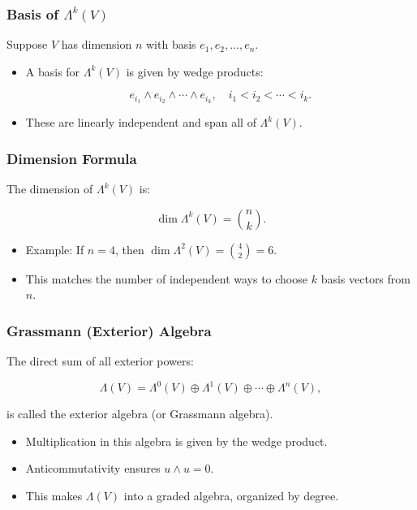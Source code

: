 \documentclass[
  letterpaper,
  DIV=11,
  numbers=noendperiod]{scrreprt}
\providecommand{\tightlist}{%
  \setlength{\itemsep}{0pt}\setlength{\parskip}{0pt}}
\begin{document}
\subsubsection{\texorpdfstring{Basis of
\(\Lambda^k(V)\)}{Basis of \textbackslash Lambda\^{}k(V)}}\label{basis-of-lambdakv}

Suppose \(V\) has dimension \(n\) with basis \(e_1, e_2, \dots, e_n\).

\begin{itemize}
\item
  A basis for \(\Lambda^k(V)\) is given by wedge products:

  \[
  e_{i_1} \wedge e_{i_2} \wedge \cdots \wedge e_{i_k}, \quad i_1 < i_2 < \cdots < i_k.
  \]
\item
  These are linearly independent and span all of \(\Lambda^k(V)\).
\end{itemize}

\subsubsection{Dimension Formula}\label{dimension-formula-1}

The dimension of \(\Lambda^k(V)\) is:

\[
\dim \Lambda^k(V) = \binom{n}{k}.
\]

\begin{itemize}
\tightlist
\item
  Example: If \(n=4\), then \(\dim \Lambda^2(V) = \binom{4}{2} = 6\).
\item
  This matches the number of independent ways to choose \(k\) basis
  vectors from \(n\).
\end{itemize}

\subsubsection{Grassmann (Exterior)
Algebra}\label{grassmann-exterior-algebra}

The direct sum of all exterior powers:

\[
\Lambda(V) = \Lambda^0(V) \oplus \Lambda^1(V) \oplus \cdots \oplus \Lambda^n(V),
\]

is called the exterior algebra (or Grassmann algebra).

\begin{itemize}
\tightlist
\item
  Multiplication in this algebra is given by the wedge product.
\item
  Anticommutativity ensures \(u \wedge u = 0\).
\item
  This makes \(\Lambda(V)\) into a graded algebra, organized by degree.
\end{itemize}
\end{document}

